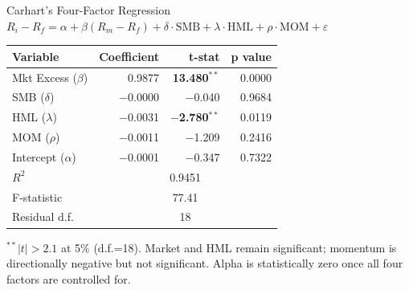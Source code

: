 \documentclass[11pt, aspectratio=43]{beamer}
\begin{document}
\begin{frame}{Carhart's Four-Factor Regression}
\centering
\small
$R_i - R_f = \alpha + \beta(R_m - R_f) + \delta \cdot \text{SMB} + \lambda \cdot \text{HML} + \rho \cdot \text{MOM} + \varepsilon$

\vspace{0.5em}
\begin{tabular}{l r r r}
\toprule
\textbf{Variable} & \textbf{Coefficient} & \textbf{t-stat} & \textbf{p value}\\
\midrule
Mkt Excess ($\beta$) & 0.9877 & \textbf{13.480}$^{**}$ & 0.0000\\
SMB ($\delta$) & $-$0.0000 & $-$0.040 & 0.9684\\
HML ($\lambda$) & $-$0.0031 & \textbf{$-$2.780}$^{**}$ & 0.0119\\
MOM ($\rho$) & $-$0.0011 & $-$1.209 & 0.2416 \\
Intercept ($\alpha$) & $-$0.0001 & $-$0.347 & 0.7322 \\
\midrule
$R^2$ & \multicolumn{3}{c}{0.9451} \\
F-statistic & \multicolumn{3}{c}{77.41} \\
Residual d.f. & \multicolumn{3}{c}{18} \\
\bottomrule
\end{tabular}

\vspace{0.5em}
\footnotesize
$^{**}|t|>2.1$ at 5\% (d.f.=18). Market and HML remain significant; momentum
is directionally negative but not significant. Alpha is statistically zero
once all four factors are controlled for.
\end{frame}
\end{document}
